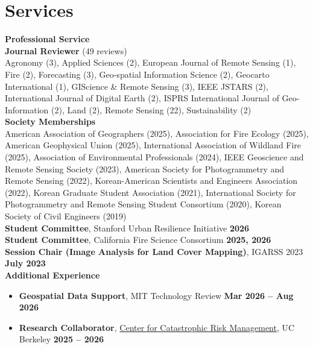 \newcommand{\community}[3]
  {\small \color{hlcolor-0} \textbf{#1}{, #2} \textbf{\hfill{#3}}}

\section*{Services}
\begin{cvcontent}
  \textbf{\large Professional Service}\\[2mm]
  \textbf{Journal Reviewer} (49 reviews) \\
  {\small Agronomy (3), Applied Sciences (2), European Journal of Remote Sensing (1), Fire (2), Forecasting (3), Geo-spatial Information Science (2), Geocarto International (1), GIScience \& Remote Sensing (3), IEEE JSTARS (2), International Journal of Digital Earth (2), ISPRS International Journal of Geo-Information (2), Land (2), Remote Sensing (22), Sustainability (2)} \\[2mm]
  \textbf{Society Memberships} \\
  {\small American Association of Geographers (2025), Association for Fire Ecology (2025), American Geophysical Union (2025), International Association of Wildland Fire (2025), Association of Environmental Professionals (2024), IEEE Geoscience and Remote Sensing Society (2023), American Society for Photogrammetry and Remote Sensing (2022), Korean-American Scientists and Engineers Association (2022), Korean Graduate Student Association (2021), International Society for Photogrammetry and Remote Sensing Student Consortium (2020), Korean Society of Civil Engineers (2019)} \\[2mm]
  \community{Student Committee}{Stanford Urban Resilience Initiative}{2026}\\[3mm]
  \community{Student Committee}{California Fire Science Consortium}{2025, 2026}\\[3mm]
  \community{Session Chair (Image Analysis for Land Cover Mapping)}{IGARSS 2023}{July 2023}\\[5mm]
  \textbf{\large Additional Experience}\\[-6mm]
  \begin{itemize}[leftmargin=1cm]
    \setlength\itemsep{1.5mm}
    \item \community{Geospatial Data Support}{MIT Technology Review}{Mar 2026 -- Aug 2026}\\
    \small{}
    \item \community{Research Collaborator}{\href{https://ccrm.berkeley.edu}{Center for Catastrophic Risk Management}, UC Berkeley}{2025 -- 2026}\\

\end{itemize}
\end{cvcontent}
